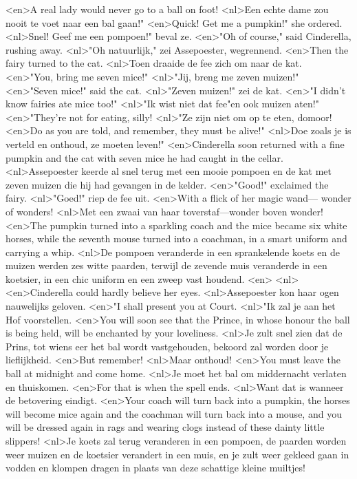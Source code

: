 <en>A real lady would never go to a ball on foot!
<nl>Een echte dame zou nooit te voet naar een bal gaan!"
<en>Quick! Get me a pumpkin!" she ordered.
<nl>Snel! Geef me een pompoen!" beval ze.
<en>"Oh of course," said Cinderella, rushing away.
<nl>"Oh natuurlijk," zei Assepoester, wegrennend.
<en>Then the fairy turned to the cat.
<nl>Toen draaide de fee zich om naar de kat.
<en>"You, bring me seven mice!"
<nl>"Jij, breng me zeven muizen!"
<en>"Seven mice!" said the cat.
<nl>"Zeven muizen!" zei de kat.
<en>"I didn’t know fairies ate mice too!"
<nl>"Ik wist niet dat fee"en ook muizen aten!"
<en>"They’re not for eating, silly!
<nl>"Ze zijn niet om  op te eten, domoor!
<en>Do as you are told, and remember, they must be alive!"
<nl>Doe zoals je is verteld en onthoud, ze moeten leven!"
<en>Cinderella soon returned with a fine pumpkin and the cat with seven mice he had caught in the cellar.
<nl>Assepoester keerde al snel terug met een mooie pompoen en de kat met zeven muizen die hij had gevangen  in de kelder.
<en>"Good!" exclaimed the fairy.
<nl>"Goed!" riep de fee uit.
<en>With a flick of her magic wand--- wonder of wonders!
<nl>Met een zwaai van haar toverstaf---wonder boven wonder!
<en>The pumpkin turned into a sparkling coach and the mice became six white horses, while the seventh mouse turned into a coachman, in a smart uniform and carrying a whip.
<nl>De pompoen veranderde in een sprankelende koets en de muizen werden zes witte paarden, terwijl de zevende muis veranderde in een koetsier, in een chic uniform en  een zweep vast houdend.
<en>
<nl>
<en>Cinderella could hardly believe her eyes.
<nl>Assepoester kon haar ogen nauwelijks geloven.
<en>"I shall present you at Court.
<nl>"Ik zal je aan het Hof voorstellen.
<en>You will soon see that the Prince, in whose honour the ball is being held, will be enchanted by your loveliness.
<nl>Je zult snel zien dat de Prins, tot wiens eer het bal wordt vastgehouden, bekoord zal worden door je lieflijkheid.
<en>But remember!
<nl>Maar onthoud!
<en>You must leave the ball at midnight and come home.
<nl>Je moet het bal om middernacht verlaten en thuiskomen.
<en>For that is when the spell ends.
<nl>Want dat is wanneer de betovering eindigt.
<en>Your coach will turn back into a pumpkin, the horses will become mice again and the coachman will turn back into a mouse, and you will be dressed again in rags and wearing clogs instead of these dainty little slippers!
<nl>Je koets zal terug veranderen in een pompoen, de paarden worden weer muizen en de koetsier verandert in een muis, en je zult weer gekleed gaan in vodden en klompen dragen in plaats van deze schattige kleine muiltjes!
